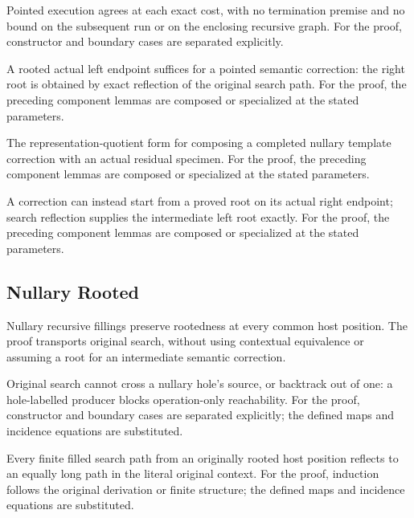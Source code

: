 Pointed execution agrees at each exact cost, with no termination premise and no bound on the subsequent run or on the enclosing recursive graph.
For the proof, constructor and boundary cases are separated explicitly.
\par{}

A rooted actual left endpoint suffices for a pointed semantic correction: the right root is obtained by exact reflection of the original search path.
For the proof, the preceding component lemmas are composed or specialized at the stated parameters.
\par{}

The representation-quotient form for composing a completed nullary template correction with an actual residual specimen.
For the proof, the preceding component lemmas are composed or specialized at the stated parameters.
\par{}

A correction can instead start from a proved root on its actual right endpoint; search reflection supplies the intermediate left root exactly.
For the proof, the preceding component lemmas are composed or specialized at the stated parameters.
\par{}

\subsection{Nullary Rooted}
Nullary recursive fillings preserve rootedness at every common host position. The proof transports original search, without using contextual equivalence or assuming a root for an intermediate semantic correction.

Original search cannot cross a nullary hole's source, or backtrack out of one: a hole-labelled producer blocks operation-only reachability.
For the proof, constructor and boundary cases are separated explicitly; the defined maps and incidence equations are substituted.
\par{}

Every finite filled search path from an originally rooted host position reflects to an equally long path in the literal original context.
For the proof, induction follows the original derivation or finite structure; the defined maps and incidence equations are substituted.
\par{}

